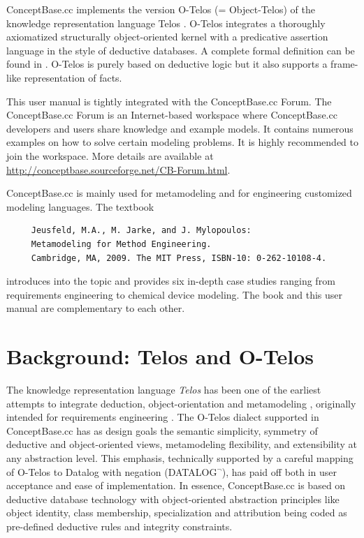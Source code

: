 ConceptBase.cc implements the version O-Telos (= Object-Telos)
of the knowledge representation language
Telos \cite{mbjk90}. O-Telos integrates a thoroughly axiomatized structurally
object-oriented kernel with a predicative assertion language in the style
of deductive databases. A complete formal definition can be found in
\cite{JIIS,jeus92}. O-Telos is purely based on deductive logic but it also
supports a frame-like representation of facts.

This user manual is tightly integrated with the ConceptBase.cc Forum. The ConceptBase.cc Forum is
an Internet-based workspace where ConceptBase.cc developers and users share knowledge
and example models.
It contains numerous examples on how to solve certain modeling problems. It is
highly recommended to join the workspace.
More details are available at
\url{http://conceptbase.sourceforge.net/CB-Forum.html}.

ConceptBase.cc is mainly used for metamodeling and for engineering customized
modeling languages. The textbook \cite{jjm09}

{\small
\begin{verbatim}
     Jeusfeld, M.A., M. Jarke, and J. Mylopoulos:
     Metamodeling for Method Engineering.
     Cambridge, MA, 2009. The MIT Press, ISBN-10: 0-262-10108-4.
\end{verbatim}
}

introduces into the topic and provides six in-depth case studies ranging from 
requirements engineering to chemical device modeling. The book and this
user manual are complementary to each other.



\section{Background: Telos and O-Telos}

The knowledge representation language {\em Telos} has been
one of the earliest attempts to integrate deduction, object-orientation
and metamodeling \cite{STAN86,mbjk90}, originally intended for requirements engineering \cite{Koub20}.
The O-Telos \cite{jeus92} dialect supported in ConceptBase.cc has as design goals the
semantic simplicity, symmetry of deductive and object-oriented views, metamodeling flexibility,
and extensibility at any abstraction level.
This emphasis, technically supported by a careful mapping of O-Telos to Datalog
with negation (DATALOG$^\neg$), has paid off both in user acceptance
and ease of implementation. In essence, ConceptBase.cc is based on deductive database
technology with object-oriented abstraction principles like object identity,
class membership, specialization and attribution being coded as pre-defined
deductive rules and integrity constraints.

